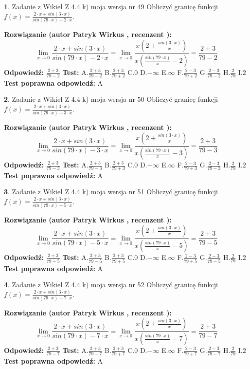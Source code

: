 \documentclass[12pt, a4paper]{article}
\theoremstyle{definition} %
\newtheorem{zad}{}
\newcommand{\zadStart}[1]{\begin{zad}#1\newline}
\newcommand{\zadStop}{\end{zad}}
\newcommand{\rozwStart}[2]{\noindent \textbf{Rozwiązanie (autor #1 , recenzent #2): }\newline}
\newcommand{\rozwStop}{\newline}
\newcommand{\odpStart}{\noindent \textbf{Odpowiedź:}\newline}
\newcommand{\odpStop}{\newline}
\newcommand{\testStart}{\noindent \textbf{Test:}\newline}
\newcommand{\testStop}{\newline}
\newcommand{\kluczStart}{\noindent \textbf{Test poprawna odpowiedź:}\newline}
\newcommand{\kluczStop}{\newline}
\begin{document}
\zadStart{Zadanie z Wikieł Z 4.4 k) moja wersja nr 49}
Obliczyć granicę funkcji $f(x)=\frac{2\cdot x +sin(3\cdot x)}{sin(79\cdot x) -2\cdot x}$.
\zadStop
\rozwStart{Patryk Wirkus}{}
$$\lim\limits_{x\to 0}\frac{2\cdot x +sin(3\cdot x)}{sin(79\cdot x) -2\cdot x}
=\lim\limits_{x\to 0}\frac{x(2+\frac{sin(3\cdot x)}{x})}{x(\frac{sin(79\cdot x)}{x}-2)}
=\frac{2+3}{79-2}$$
\rozwStop
\odpStart
$\frac{2+3}{79-2}$
\odpStop
\testStart
A.$\frac{2+3}{79-2}$
B.$\frac{2+3}{79+2}$
C.$0$
D.$-\infty$
E.$\infty$
F.$\frac{2-3}{79+2}$
G.$\frac{2-3}{79-2}$
H.$\frac{2}{79}$
I.$2$
\testStop
\kluczStart
A
\kluczStop



\zadStart{Zadanie z Wikieł Z 4.4 k) moja wersja nr 50}
Obliczyć granicę funkcji $f(x)=\frac{2\cdot x +sin(3\cdot x)}{sin(79\cdot x) -3\cdot x}$.
\zadStop
\rozwStart{Patryk Wirkus}{}
$$\lim\limits_{x\to 0}\frac{2\cdot x +sin(3\cdot x)}{sin(79\cdot x) -3\cdot x}
=\lim\limits_{x\to 0}\frac{x(2+\frac{sin(3\cdot x)}{x})}{x(\frac{sin(79\cdot x)}{x}-3)}
=\frac{2+3}{79-3}$$
\rozwStop
\odpStart
$\frac{2+3}{79-3}$
\odpStop
\testStart
A.$\frac{2+3}{79-3}$
B.$\frac{2+3}{79+3}$
C.$0$
D.$-\infty$
E.$\infty$
F.$\frac{2-3}{79+3}$
G.$\frac{2-3}{79-3}$
H.$\frac{2}{79}$
I.$2$
\testStop
\kluczStart
A
\kluczStop



\zadStart{Zadanie z Wikieł Z 4.4 k) moja wersja nr 51}
Obliczyć granicę funkcji $f(x)=\frac{2\cdot x +sin(3\cdot x)}{sin(79\cdot x) -5\cdot x}$.
\zadStop
\rozwStart{Patryk Wirkus}{}
$$\lim\limits_{x\to 0}\frac{2\cdot x +sin(3\cdot x)}{sin(79\cdot x) -5\cdot x}
=\lim\limits_{x\to 0}\frac{x(2+\frac{sin(3\cdot x)}{x})}{x(\frac{sin(79\cdot x)}{x}-5)}
=\frac{2+3}{79-5}$$
\rozwStop
\odpStart
$\frac{2+3}{79-5}$
\odpStop
\testStart
A.$\frac{2+3}{79-5}$
B.$\frac{2+3}{79+5}$
C.$0$
D.$-\infty$
E.$\infty$
F.$\frac{2-3}{79+5}$
G.$\frac{2-3}{79-5}$
H.$\frac{2}{79}$
I.$2$
\testStop
\kluczStart
A
\kluczStop



\zadStart{Zadanie z Wikieł Z 4.4 k) moja wersja nr 52}
Obliczyć granicę funkcji $f(x)=\frac{2\cdot x +sin(3\cdot x)}{sin(79\cdot x) -7\cdot x}$.
\zadStop
\rozwStart{Patryk Wirkus}{}
$$\lim\limits_{x\to 0}\frac{2\cdot x +sin(3\cdot x)}{sin(79\cdot x) -7\cdot x}
=\lim\limits_{x\to 0}\frac{x(2+\frac{sin(3\cdot x)}{x})}{x(\frac{sin(79\cdot x)}{x}-7)}
=\frac{2+3}{79-7}$$
\rozwStop
\odpStart
$\frac{2+3}{79-7}$
\odpStop
\testStart
A.$\frac{2+3}{79-7}$
B.$\frac{2+3}{79+7}$
C.$0$
D.$-\infty$
E.$\infty$
F.$\frac{2-3}{79+7}$
G.$\frac{2-3}{79-7}$
H.$\frac{2}{79}$
I.$2$
\testStop
\kluczStart
A
\kluczStop
\end{document}
